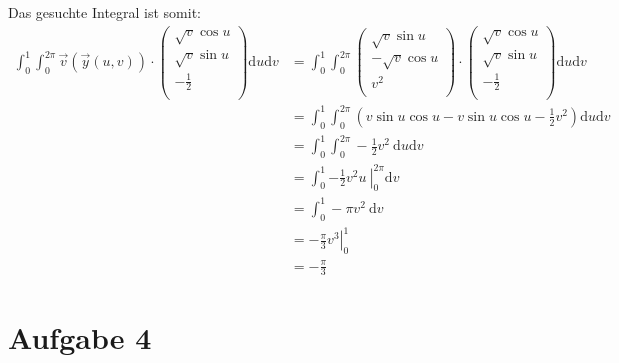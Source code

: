 \documentclass[10pt,a4paper,parskip=half]{scrartcl}
\newcommand{\vecthree}[3]{\begin{pmatrix}#1\\#2\\#3\\\end {pmatrix}}
\begin{document}
Das gesuchte Integral ist somit:
\begin{align*}
\int_0^1 \int_0^{2\pi} \vec v(\vec y(u,v)) \cdot \vecthree{\sqrt{v}\cos u}{\sqrt{v}\sin u}{-\frac 1 2} \mathrm d u \mathrm d v &= \int_0^1 \int_0^{2\pi} \vecthree{\sqrt v\sin u}{-\sqrt v\cos u}{v^2} \cdot \vecthree{\sqrt{v}\cos u}{\sqrt{v}\sin u}{-\frac 1 2} \mathrm d u \mathrm d v \\
&= \int_0^1 \int_0^{2\pi} \left(v \sin u \cos u - v \sin u \cos u - \frac 1 2 v^2\right) \mathrm d u \mathrm d v \\
&= \int_0^1 \int_0^{2\pi} - \frac 1 2 v^2~ \mathrm d u \mathrm d v \\
&= \int_0^1 \left. - \frac 1 2 v^2 u~ \right|_0^{2\pi} \mathrm d v \\
&= \int_0^1 - \pi v^2 ~ \mathrm d v \\
&= \left. - \frac \pi 3 v^3 \right|_0^1 \\
&= -\frac \pi 3
\end{align*}
\section*{Aufgabe 4}
\end{document}

